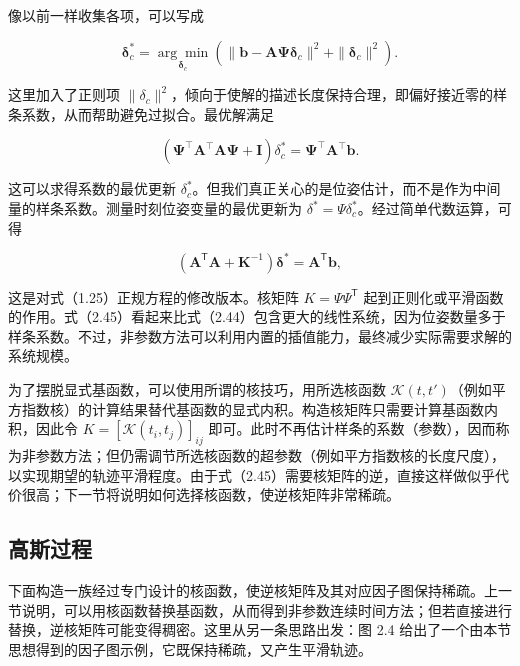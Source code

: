 像以前一样收集各项，可以写成

\begin{equation}
\boldsymbol {\delta} _ {c} ^ {*} = \underset {\boldsymbol {\delta} _ {c}} {\arg \min} \left(\| \boldsymbol {b} - \boldsymbol {A} \boldsymbol {\Psi} \boldsymbol {\delta} _ {c} \| ^ {2} + \| \boldsymbol {\delta} _ {c} \| ^ {2}\right).\tag{2.43}
\end{equation}

这里加入了正则项 $\|\delta_c\|^2$，倾向于使解的描述长度保持合理，即偏好接近零的样条系数，从而帮助避免过拟合。最优解满足

\begin{equation}
\left(\boldsymbol {\Psi} ^ {\top} \boldsymbol {A} ^ {\top} \boldsymbol {A} \boldsymbol {\Psi} + \mathbf {I}\right) \delta_ {c} ^ {*} = \boldsymbol {\Psi} ^ {\top} \boldsymbol {A} ^ {\top} \boldsymbol {b}.\tag{2.44}
\end{equation}

这可以求得系数的最优更新 $\delta_c^*$。但我们真正关心的是位姿估计，而不是作为中间量的样条系数。测量时刻位姿变量的最优更新为 $\delta^*=\Psi\delta_c^*$。经过简单代数运算，可得

\begin{equation}
\left(\boldsymbol {A} ^ {\mathsf {T}} \boldsymbol {A} + \boldsymbol {K} ^ {- 1}\right) \boldsymbol {\delta} ^ {*} = \boldsymbol {A} ^ {\mathsf {T}} \boldsymbol {b},\tag{2.45}
\end{equation}

这是对式（1.25）正规方程的修改版本。核矩阵 $K=\Psi\Psi^\mathsf T$ 起到正则化或平滑函数的作用。式（2.45）看起来比式（2.44）包含更大的线性系统，因为位姿数量多于样条系数。不过，非参数方法可以利用内置的插值能力，最终减少实际需要求解的系统规模。

为了摆脱显式基函数，可以使用所谓的核技巧，用所选核函数 $\mathcal{K}(t,t')$（例如平方指数核）的计算结果替代基函数的显式内积。构造核矩阵只需要计算基函数内积，因此令 $K=[\mathcal{K}(t_i,t_j)]_{ij}$ 即可。此时不再估计样条的系数（参数），因而称为非参数方法；但仍需调节所选核函数的超参数（例如平方指数核的长度尺度），以实现期望的轨迹平滑程度。由于式（2.45）需要核矩阵的逆，直接这样做似乎代价很高；下一节将说明如何选择核函数，使逆核矩阵非常稀疏。

\subsection{高斯过程}

下面构造一族经过专门设计的核函数，使逆核矩阵及其对应因子图保持稀疏。上一节说明，可以用核函数替换基函数，从而得到非参数连续时间方法；但若直接进行替换，逆核矩阵可能变得稠密。这里从另一条思路出发：图 2.4 给出了一个由本节思想得到的因子图示例，它既保持稀疏，又产生平滑轨迹。

